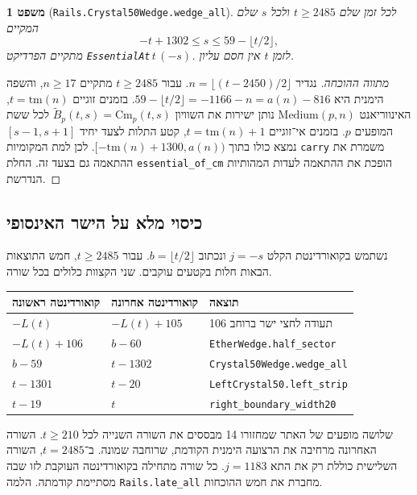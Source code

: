 \documentclass[11pt,a4paper]{article}
\DeclareRobustCommand{\textenglish}[1]{\foreignlanguage{english}{#1}}
\newtheorem{theorem}{משפט}[section]
\theoremstyle{definition}
\begin{document}
\begin{theorem}[\textenglish{\texttt{Rails.Crystal50Wedge.wedge\_all}}]\label{thm:wedge_all}
לכל זמן שלם $t \ge 2485$ ולכל $s$ שלם המקיים
\begin{equation}\label{eq:wedge_region}
-t + 1302 \le s \le 59 - \lfloor t/2 \rfloor,
\end{equation}
מתקיים הפרדיקט \textenglish{\texttt{EssentialAt}}\,$t\,(-s)$. לזמן $t$ אין חסם עליון.
\end{theorem}

\begin{proof}[מתווה ההוכחה]
נגדיר $n = \lfloor (t - 2450) / 2 \rfloor$. עבור $t \ge 2485$ מתקיים $n \ge 17$, והשפה הימנית היא $59 - \lfloor t/2 \rfloor = -1166 - n = a(n) - 816$. בזמנים זוגיים $t = \mathrm{tm}(n)$, האינווריאנט $\mathrm{Medium}(p, n)$ נותן ישירות את השוויון $\widetilde B_p(t, s) = \mathrm{Cm}_p(t, s)$ לכל ששת המופעים $p$. בזמנים אי־זוגיים $t = \mathrm{tm}(n) + 1$, קטע התלות לצעד יחיד $[s - 1, s + 1]$ נמצא כולו בתוך $[-\mathrm{tm}(n) + 1300, a(n))$. לכן למת המקומיות \textenglish{\texttt{carry}} משמרת את ההתאמה גם בצעד זה. החלת \textenglish{\texttt{essential\_of\_cm}} הופכת את ההתאמה לעדות המהותיות הנדרשת.
\end{proof}

\subsection{כיסוי מלא על הישר האינסופי}\label{sec:five-bands}
נשתמש בקואורדינטת הקלט $j=-s$ ונכתוב $b=\lfloor t/2\rfloor$. עבור $t\ge2485$, חמש התוצאות הבאות חלות בקטעים עוקבים. שני הקצוות כלולים בכל שורה.
\begin{center}
\begin{tabular}{lll}
\toprule
קואורדינטה ראשונה & קואורדינטה אחרונה & תוצאה \\
\midrule
$-L(t)$ & $-L(t)+105$ & תעודה לחצי ישר ברוחב 106 \\
$-L(t)+106$ & $b-60$ & \textenglish{\texttt{EtherWedge.half\_sector}} \\
$b-59$ & $t-1302$ & \textenglish{\texttt{Crystal50Wedge.wedge\_all}} \\
$t-1301$ & $t-20$ & \textenglish{\texttt{LeftCrystal50.left\_strip}} \\
$t-19$ & $t$ & \textenglish{\texttt{right\_boundary\_width20}} \\
\bottomrule
\end{tabular}
\end{center}
שלושה מופעים של האתר שמחזורו 14 מבססים את השורה השנייה לכל $t\ge210$. השורה האחרונה מרחיבה את הרצועה הימנית הקודמת, שרוחבה שמונה. ב־$t=2485$, השורה השלישית כוללת רק את התא $j=1183$. כל שורה מתחילה בקואורדינטה העוקבת לזו שבה מסתיימת קודמתה. הלמה \textenglish{\texttt{Rails.late\_all}} מחברת את חמש ההוכחות.
\end{document}
